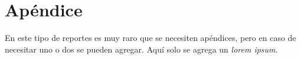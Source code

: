 \section*{Apéndice}
\label{sec:Apéndice}

En este tipo de reportes es muy raro que se necesiten apéndices, pero en caso de necesitar uno o dos se pueden agregar. Aquí solo se agrega un \textit{lorem ipsum}.

\lipsum[1-2]

\newpage